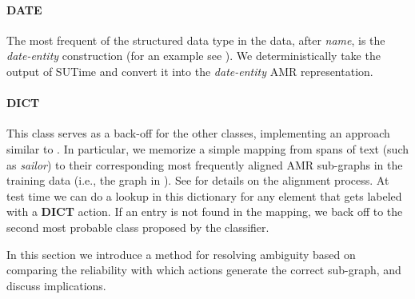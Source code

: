 \documentclass[11pt]{article}
\newcommand\w[1]{\textit{#1}} %
\newcommand\n[1]{\textit{#1}} %
\begin{document}
\paragraph{DATE} The most frequent of the structured data type in the data, after \n{name}, is the \n{date-entity} construction (for an example see ).
We deterministically take the output of SUTime \cite{2012chang-temporal}
  and convert it into the \n{date-entity} AMR representation.

\paragraph{DICT} This class serves as a back-off for the other classes, implementing
an approach similar to .
In particular, we memorize a simple mapping from spans of text
  (such as \w{sailor}) to their corresponding most frequently aligned AMR sub-graphs 
  in the training data (i.e., the graph in ). 
See  for details on the alignment process.
At test time we can do a lookup in this dictionary for any element that gets 
  labeled with a \textbf{DICT} action. 
If an entry is not found in the mapping, we back off to the second most probable
  class proposed by the classifier.


%
%


In this section we introduce a method for resolving ambiguity based on comparing the reliability with which actions generate the correct sub-graph, and discuss implications.

\end{document}
